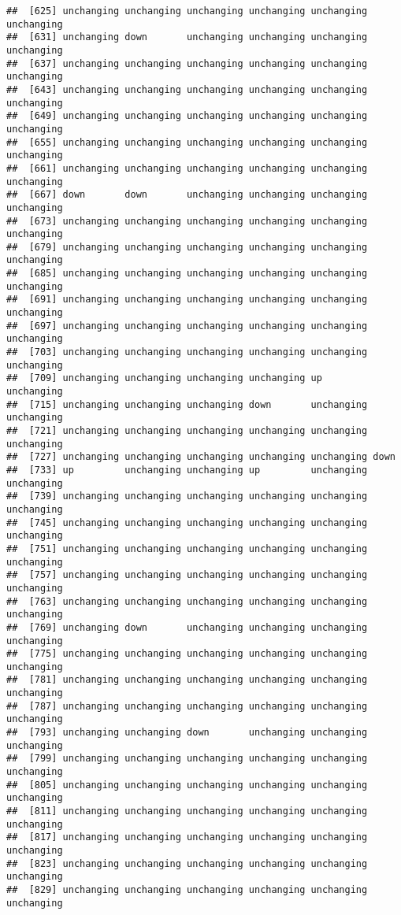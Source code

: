 \documentclass[]{article}
\begin{document}
\begin{verbatim}
##  [625] unchanging unchanging unchanging unchanging unchanging unchanging
##  [631] unchanging down       unchanging unchanging unchanging unchanging
##  [637] unchanging unchanging unchanging unchanging unchanging unchanging
##  [643] unchanging unchanging unchanging unchanging unchanging unchanging
##  [649] unchanging unchanging unchanging unchanging unchanging unchanging
##  [655] unchanging unchanging unchanging unchanging unchanging unchanging
##  [661] unchanging unchanging unchanging unchanging unchanging unchanging
##  [667] down       down       unchanging unchanging unchanging unchanging
##  [673] unchanging unchanging unchanging unchanging unchanging unchanging
##  [679] unchanging unchanging unchanging unchanging unchanging unchanging
##  [685] unchanging unchanging unchanging unchanging unchanging unchanging
##  [691] unchanging unchanging unchanging unchanging unchanging unchanging
##  [697] unchanging unchanging unchanging unchanging unchanging unchanging
##  [703] unchanging unchanging unchanging unchanging unchanging unchanging
##  [709] unchanging unchanging unchanging unchanging up         unchanging
##  [715] unchanging unchanging unchanging down       unchanging unchanging
##  [721] unchanging unchanging unchanging unchanging unchanging unchanging
##  [727] unchanging unchanging unchanging unchanging unchanging down      
##  [733] up         unchanging unchanging up         unchanging unchanging
##  [739] unchanging unchanging unchanging unchanging unchanging unchanging
##  [745] unchanging unchanging unchanging unchanging unchanging unchanging
##  [751] unchanging unchanging unchanging unchanging unchanging unchanging
##  [757] unchanging unchanging unchanging unchanging unchanging unchanging
##  [763] unchanging unchanging unchanging unchanging unchanging unchanging
##  [769] unchanging down       unchanging unchanging unchanging unchanging
##  [775] unchanging unchanging unchanging unchanging unchanging unchanging
##  [781] unchanging unchanging unchanging unchanging unchanging unchanging
##  [787] unchanging unchanging unchanging unchanging unchanging unchanging
##  [793] unchanging unchanging down       unchanging unchanging unchanging
##  [799] unchanging unchanging unchanging unchanging unchanging unchanging
##  [805] unchanging unchanging unchanging unchanging unchanging unchanging
##  [811] unchanging unchanging unchanging unchanging unchanging unchanging
##  [817] unchanging unchanging unchanging unchanging unchanging unchanging
##  [823] unchanging unchanging unchanging unchanging unchanging unchanging
##  [829] unchanging unchanging unchanging unchanging unchanging unchanging

\end{verbatim}
\end{document}
